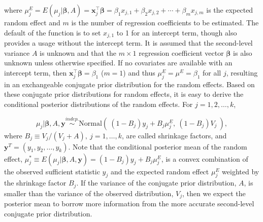 \documentclass[article]{jss}
\begin{document}
where $\mu^E_{j} = E(\mu_j\vert \boldsymbol{\beta}, A) = \boldsymbol{x}_j^\top \boldsymbol{\beta}=\beta_{1}x_{j, 1}+\beta_{2}x_{j, 2} + \cdots + \beta_{m}x_{j, m}$ is the expected random effect and $m$ is the number of regression coefficients to be estimated. The default of the function  is to set $x_{j, 1}$ to 1 for an intercept term, though  also provides a usage without the intercept term.  It is assumed that the second-level variance $A$ is unknown and that the $m\times1$ regression coefficient vector $\boldsymbol{\beta}$ is also unknown unless otherwise specified. If no covariates are available with an intercept term, then $\boldsymbol{x}_j^\top \boldsymbol{\beta}=\beta_1$ ($m=1$) and thus $\mu^E_{j}=\mu^E=\beta_1$ for all $j$, resulting in an exchangeable conjugate prior distribution for the random effects.  Based on these conjugate prior distributions for random effects, it is easy to derive the conditional posterior distributions of the random effects. For $j=1, 2, \ldots, k$,

\begin{equation} \label{normalpost}
\mu_{j}\vert  \boldsymbol{\beta}, A, \boldsymbol{y} \stackrel{indep.}{\sim}\textrm{Normal}(~(1-B_{j})y_{j} + B_{j}\mu^E_{j},~(1-B_{j})V_{j}~),
\end{equation}
where $B_{j}\equiv V_{j}/(V_{j} + A),~j=1, \ldots, k$, are called shrinkage factors, and $\boldsymbol{y}^T=(y_1, y_2, \ldots, y_k)$. Note that the conditional posterior mean of the random effect, $\mu^\ast_j\equiv E(\mu_{j}\vert \boldsymbol{\beta}, A, \boldsymbol{y} )=(1-B_{j})y_{j} + B_{j}\mu^E_{j}$,  is a convex combination of the observed sufficient statistic $y_j$ and the expected random effect $\mu^E_j$ weighted by the shrinkage factor $B_j$. If the variance of the conjugate prior distribution, $A$, is smaller than the variance of the observed distribution, $V_j$, then we expect the posterior mean to borrow more information from the more accurate second-level conjugate prior distribution.
\end{document}
